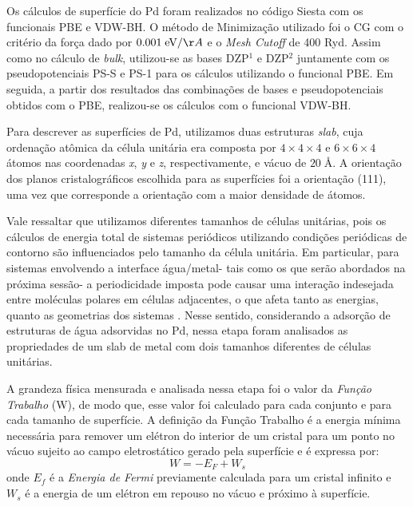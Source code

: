 Os cálculos de superfície do Pd foram realizados no código Siesta com os funcionais PBE e VDW-BH. O método de Minimização utilizado foi o CG com o critério da força dado por $ 0.001\;\text{eV}/\AA$ e o \textit{Mesh Cutoff} de 400 Ryd. Assim como no cálculo de \textit{bulk}, utilizou-se as bases DZP$ ^1 $ e DZP$^2  $ juntamente com os pseudopotenciais PS-S e PS-1 para os cálculos utilizando o funcional PBE. Em seguida, a partir dos resultados das combinações de bases e pseudopotenciais obtidos com o PBE, realizou-se os cálculos com o funcional VDW-BH.

Para descrever as superfícies de Pd, utilizamos duas estruturas \textit{slab}, cuja ordenação atômica da célula unitária era composta por $ 4\times 4\times 4$ e $ 6\times 6\times 4 $ átomos nas coordenadas \textit{x}, \textit{y} e \textit{z}, respectivamente,  e vácuo de $ 20\; \si{\angstrom}$. A orientação dos planos cristalográficos escolhida para as superfícies foi a orientação (111), uma vez que corresponde a orientação com a maior densidade de átomos. %

Vale ressaltar que utilizamos diferentes tamanhos de células unitárias, pois os cálculos de energia total de sistemas periódicos utilizando condições periódicas de contorno são influenciados pelo tamanho da célula unitária. Em particular, para sistemas envolvendo a interface água/metal- tais como os que serão abordados na próxima sessão- a periodicidade imposta pode causar uma interação indesejada entre moléculas polares em células adjacentes, o que afeta tanto as energias, quanto as geometrias dos sistemas \cite{adrien}. Nesse sentido, considerando a adsorção de estruturas de água adsorvidas no Pd, nessa etapa foram analisados as propriedades de um slab de metal com dois tamanhos diferentes de células unitárias.

A grandeza física mensurada e analisada nessa etapa foi o valor da \textit{Função Trabalho} (W), de modo que, esse valor foi calculado para cada conjunto e para cada tamanho de superfície. A definição da Função Trabalho é a energia mínima necessária para remover um elétron do interior de um cristal para um ponto no vácuo sujeito ao campo eletrostático gerado pela superfície e é expressa por:
\begin{equation}\label{eq:work}
	W=-E_F+W_s
\end{equation}
onde $E_f$ é a \textit{Energia de Fermi} previamente calculada para um cristal infinito e $W_s$ é a energia de um elétron em repouso no vácuo e próximo à superfície.

